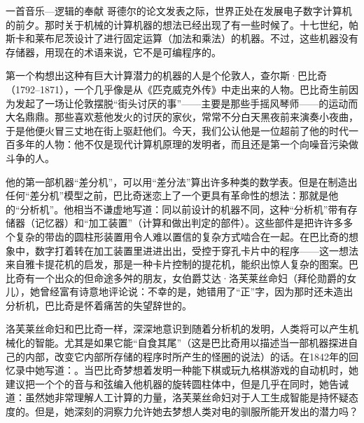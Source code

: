 \begin{intro}{一首音乐—逻辑的奉献}
哥德尔的论文发表之际，世界正处在发展电子数字计算机的前夕。那时关于机械的计算机器的想法已经出现了有一些时候了。十七世纪，帕斯卡和莱布尼茨设计了进行固定运算（加法和乘法）的机器。不过，这些机器没有存储器，用现在的术语来说，它不是可编程序的。

第一个构想出这种有巨大计算潜力的机器的人是个伦敦人，查尔斯·巴比奇（1792--1871），一个几乎像是从《匹克威克外传》中走出来的人物。巴比奇生前因为发起了一场让伦敦摆脱“街头讨厌的事”——主要是那些手摇风琴师——的运动而大名鼎鼎。那些喜欢惹他发火的讨厌的家伙，常常不分白天黑夜前来演奏小夜曲，于是他便火冒三丈地在街上驱赶他们。今天，我们公认他是一位超前了他的时代一百多年的人物：他不仅是现代计算机原理的发明者，而且还是第一个向噪音污染做斗争的人。

他的第一部机器“差分机”，可以用“差分法”算出许多种类的数学表。但是在制造出任何“差分机”模型之前，巴比奇迷恋上了一个更具有革命性的想法：那就是他的“分析机”。他相当不谦虚地写道：同以前设计的机器不同，这种“分析机”带有存储器（记忆器）和“加工装置”（计算和做出判定的部件）。这些部件是把许许多多个复杂的带齿的圆柱形装置用令人难以置信的复杂方式啮合在一起。在巴比奇的想象中，数字打着转在加工装置里进进出出，受控于穿孔卡片中的程序——这一想法来自雅卡提花机的启发，那是一种卡片控制的提花机，能织出惊人复杂的图案。巴比奇有一个出众的但命途多舛的朋友，女伯爵艾达·洛芙莱丝命妇（拜伦勋爵的女儿），她曾经富有诗意地评论说：不幸的是，她错用了“正”字，因为那时还未造出分析机，巴比奇是怀着痛苦的失望辞世的。

洛芙莱丝命妇和巴比奇一样，深深地意识到随着分析机的发明，人类将可以产生机械化的智能。尤其是如果它能“自食其尾”（这是巴比奇用以描述当一部机器探进自己的内部，改变它内部所存储的程序时所产生的怪圈的说法）的话。在1842年的回忆录中她写道：。当巴比奇梦想着发明一种能下棋或玩九格棋游戏的自动机时，她建议把一个个的音与和弦编入他机器的旋转圆柱体中，但是几乎在同时，她告诫道：虽然她非常理解人工计算的力量，洛芙莱丝命妇对于人工生成智能是持怀疑态度的。但是，她深刻的洞察力允许她去梦想人类对电的驯服所能开发出的潜力吗？


\end{intro}
